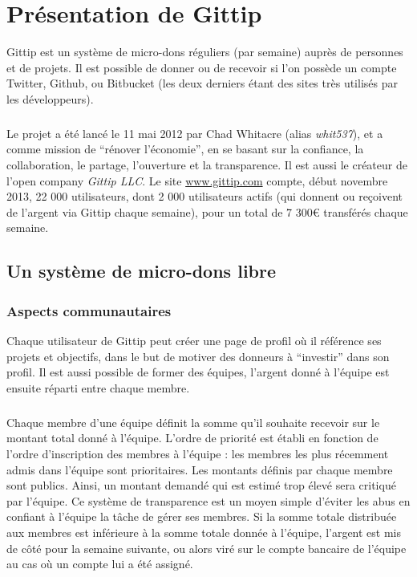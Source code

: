 \chapter{Présentation de Gittip}

Gittip est un système de micro-dons réguliers (par semaine) auprès de personnes
et de projets. Il est possible de donner ou de recevoir si l'on possède un
compte Twitter, Github, ou Bitbucket (les deux derniers étant des sites très
utilisés par les développeurs).

\paragraph{}
Le projet a été lancé le 11 mai 2012 par Chad Whitacre (alias \emph{whit537}),
et a comme mission de ``rénover l'économie'', en se basant sur la confiance, la
collaboration, le partage, l'ouverture et la transparence. Il est aussi le
créateur de l'open company \emph{Gittip LLC}. Le site \url{www.gittip.com}
compte, début novembre 2013, 22 000 utilisateurs, dont 2 000 utilisateurs
actifs (qui donnent ou reçoivent de l'argent via Gittip chaque semaine), pour
un total de 7 300\euro{} transférés chaque semaine.


    \section{Un système de micro-dons libre}

    \subsection{Aspects communautaires}

Chaque utilisateur de Gittip peut créer une page de profil où il référence ses
projets et objectifs, dans le but de motiver des donneurs à ``investir'' dans
son profil. Il est aussi possible de former des équipes, l'argent donné à
l'équipe est ensuite réparti entre chaque membre.

\paragraph{}
Chaque membre d'une équipe définit la somme qu'il souhaite recevoir sur le
montant total donné à l'équipe. L'ordre de priorité est établi en fonction de
l'ordre d'inscription des membres à l'équipe : les membres les plus récemment
admis dans l'équipe sont prioritaires. Les montants définis par chaque
membre sont publics. Ainsi, un montant demandé qui est estimé trop élevé sera
critiqué par l'équipe. Ce système de transparence est un moyen simple d'éviter
les abus en confiant à l'équipe la tâche de gérer ses membres. Si la somme
totale distribuée aux membres est inférieure à la somme totale donnée à
l'équipe, l'argent est mis de côté pour la semaine suivante, ou alors viré sur
le compte bancaire de l'équipe au cas où un compte lui a été assigné.

